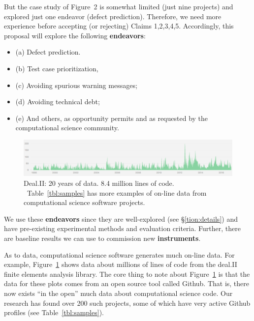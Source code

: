 \documentclass{NSF}
\newenvironment{myitemize}
{ \begin{itemize}
    \setlength{\itemsep}{0pt}
    \setlength{\parskip}{0pt}
    \setlength{\parsep}{0pt}     }
{ \end{itemize}                  }
\newcommand{\bi}{\begin{myitemize}}
\newcommand{\ei}{\end{myitemize}}
\newcommand{\tion}[1]{\S\ref{tion:#1}}
\newcommand{\tbl}[1]{Table~\ref{tbl:#1}}
\newcommand{\fig}[1]{Figure~\ref{fig:#1}}
\begin{document}
\begin{nsfdescription}
But the case study of Figure~2 is somewhat limited
(just nine projects) and explored just
one endeavor (defect prediction). Therefore, we need
more experience before 
accepting (or rejecting) 
  Claims 1,2,3,4,5.
Accordingly,
this proposal will explore the following {\bf endeavors}:
\bi
\item[(a)] Defect prediction.
\item[(b)] Test  case  prioritization,  
\item[(c)] Avoiding spurious warning messages;
\item[(d)] Avoiding technical debt;
\item[(e)] And others, as opportunity permits and as requested by the computational science community.
\ei
 \begin{figure}
 \includegraphics[width=4.7in]{fig/dealii.png}
\caption{Deal.II: 20 years of data. 8.4 million lines of code.  
~\tbl{samples} has  more 
 examples of   on-line
 data from computational science  software projects.}\label{fig:dealii}
\end{figure}We use these {\bf endeavors} since they
 are well-explored   (see \tion{details})
 and have pre-existing experimental methods and evaluation criteria.
 Further, there are  baseline results we can use to commission  new 
 {\bf instruments}.
 
 As to data, computational science software  generates much
on-line data.  For example,
\fig{dealii} shows  data about
millions of lines of code from
the deal.II finite elements analysis
library.
The core thing to note about
\fig{dealii} is that the data
for these plots comes from an open source tool called Github. 
That is, there now exists ``in the open'' much data about computational science code.
Our research has found over 200 such projects, some of which have very active Github
profiles (see \tbl{samples}).


\newpage


\end{nsfdescription}
\end{document}
